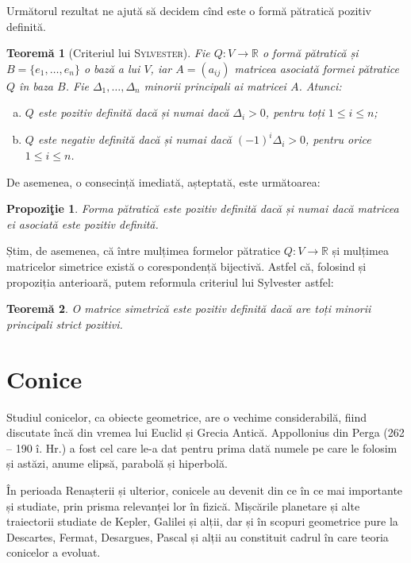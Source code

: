 \documentclass[11pt,a4paper]{article}
\theoremstyle{dotless}
\newtheorem{theorem}{Teorem\u{a}}[section]
\newtheorem{proposition}{Propozi\c{t}ie}[section]
\theoremstyle{dotlessdr}
\begin{document}
Următorul rezultat ne ajută să decidem cînd este o formă pătratică pozitiv
definită.

\begin{theorem}[Criteriul lui \textsc{Sylvester}]
	Fie $Q : V \to \mathbb{R}$ o formă pătratică și $B = \{e_1, \dots, e_n\}$
o bază a lui $V$, iar $A = (a_{ij})$ matricea asociată formei pătratice
$Q$ în baza $B$. Fie $\Delta_1, \dots, \Delta_n$ minorii principali ai matricei
$A$. Atunci:
\begin{enumerate}[(a)]
	\item $Q$ este pozitiv definită dacă și numai dacă $\Delta_i > 0$, pentru
toți $1 \leq i \leq n$;
    \item $Q$ este negativ definită dacă și numai dacă $(-1)^i \Delta_i > 0$,
pentru orice $1 \leq i \leq n$.
\end{enumerate}
\end{theorem}

De asemenea, o consecință imediată, așteptată, este următoarea:

\begin{proposition}
	Forma pătratică este pozitiv definită dacă și numai dacă matricea ei 
asociată este pozitiv definită.	
\end{proposition}

Știm, de asemenea, că între mulțimea formelor pătratice $Q : V \to \mathbb{R}$ 
și mulțimea matricelor simetrice există o corespondență bijectivă. Astfel că,
folosind și propoziția anterioară, putem reformula criteriul lui Sylvester
astfel:

\begin{theorem}
	O matrice simetrică este pozitiv definită dacă are toți minorii principali 
strict pozitivi.
\end{theorem}


\section{Conice}

\indent\indent Studiul conicelor, ca obiecte geometrice, are o vechime 
considerabilă, fiind discutate încă din vremea lui Euclid și Grecia Antică.
Appollonius din Perga (262 -- 190 î. Hr.) a fost cel care le-a dat pentru prima
dată numele pe care le folosim și astăzi, anume elipsă, parabolă și hiperbolă.

În perioada Renașterii și ulterior, conicele au devenit din ce în ce mai
importante și studiate, prin prisma relevanței lor în fizică. Mișcările 
planetare și alte traiectorii studiate de Kepler, Galilei și alții, dar și în
scopuri geometrice pure la Descartes, Fermat, Desargues, Pascal și alții au
constituit cadrul în care teoria conicelor a evoluat.
\end{document}
